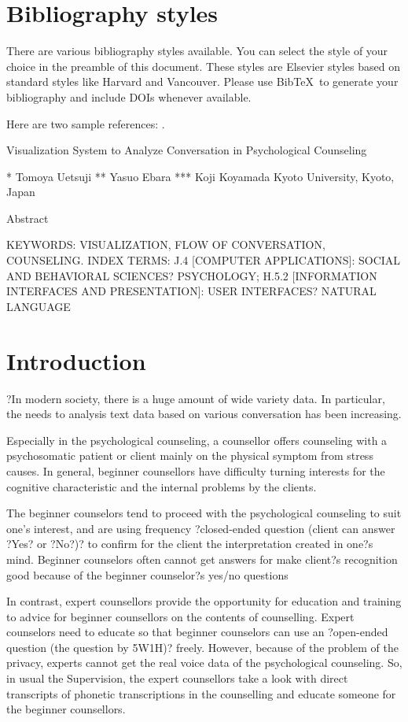 \documentclass[review]{elsarticle}
\begin{document}
\section{Bibliography styles}

There are various bibliography styles available. You can select the style of your choice in the preamble of this document. These styles are Elsevier styles based on standard styles like Harvard and Vancouver. Please use Bib\TeX\ to generate your bibliography and include DOIs whenever available.

Here are two sample references: \cite{Feynman1963118,Dirac1953888}.

Visualization System to Analyze Conversation in Psychological Counseling
 

* Tomoya Uetsuji      ** Yasuo Ebara       *** Koji Koyamada
Kyoto University, Kyoto, Japan

 
Abstract

KEYWORDS: VISUALIZATION, FLOW OF CONVERSATION, COUNSELING.
INDEX TERMS: J.4 [COMPUTER APPLICATIONS]: SOCIAL AND BEHAVIORAL SCIENCES? PSYCHOLOGY; H.5.2 [INFORMATION INTERFACES AND PRESENTATION]: USER INTERFACES? NATURAL LANGUAGE
\section{Introduction}
?In modern society, there is a huge amount of wide variety data.  In particular, the needs to analysis text data based on various conversation has been increasing.
  
  Especially in the psychological counseling, a counsellor offers counseling with a psychosomatic patient or client mainly on the physical symptom from stress causes. In general, beginner counsellors have difficulty turning interests for the cognitive characteristic and the internal problems by the clients. 

  The beginner counselors tend to proceed with the psychological counseling to suit one's interest, and are using frequency ?closed-ended question (client can answer ?Yes? or ?No?)? to confirm for the client the interpretation created in one?s mind. Beginner counselors often cannot get answers for make client?s recognition good
because of the beginner counselor?s yes/no questions

  In contrast, expert counsellors provide the opportunity for education and training to advice for beginner counsellors on the contents of counselling. Expert counselors need to educate so that beginner counselors can use an ?open-ended question (the question by 5W1H)? freely. However, because of the problem of the privacy, experts cannot get the real voice data of the psychological counseling. So, in usual the Supervision, the expert counsellors take a look with direct transcripts of phonetic transcriptions in the counselling and educate someone for the beginner counsellors.
\end{document}
